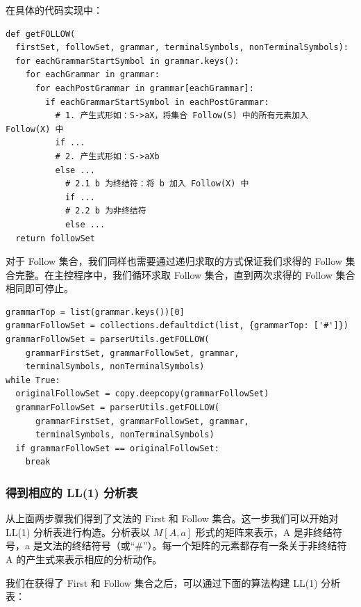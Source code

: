 \documentclass[UTF8]{ctexart}
\begin{document}
在具体的代码实现中：

\begin{verbatim}
def getFOLLOW(
  firstSet, followSet, grammar, terminalSymbols, nonTerminalSymbols):
  for eachGrammarStartSymbol in grammar.keys():
    for eachGrammar in grammar:
      for eachPostGrammar in grammar[eachGrammar]:
        if eachGrammarStartSymbol in eachPostGrammar:
          # 1. 产生式形如：S->aX，将集合 Follow(S) 中的所有元素加入 Follow(X) 中
          if ...
          # 2. 产生式形如：S->aXb
          else ...
            # 2.1 b 为终结符：将 b 加入 Follow(X) 中
            if ...
            # 2.2 b 为非终结符
            else ...
  return followSet
\end{verbatim}

对于 Follow 集合，我们同样也需要通过递归求取的方式保证我们求得的 Follow 集合完整。在主控程序中，我们循环求取 Follow 集合，直到两次求得的 Follow 集合相同即可停止。

\begin{verbatim}
grammarTop = list(grammar.keys())[0]
grammarFollowSet = collections.defaultdict(list, {grammarTop: ['#']})
grammarFollowSet = parserUtils.getFOLLOW(
    grammarFirstSet, grammarFollowSet, grammar,
    terminalSymbols, nonTerminalSymbols)
while True:
  originalFollowSet = copy.deepcopy(grammarFollowSet)
  grammarFollowSet = parserUtils.getFOLLOW(
      grammarFirstSet, grammarFollowSet, grammar,
      terminalSymbols, nonTerminalSymbols)
  if grammarFollowSet == originalFollowSet:
    break
\end{verbatim}

\subsubsection{得到相应的 LL(1) 分析表}
从上面两步骤我们得到了文法的 First 和 Follow 集合。这一步我们可以开始对 LL(1) 分析表进行构造。分析表以 $M[A,a]$ 形式的矩阵来表示，A 是非终结符号，a 是文法的终结符号（或“\#”）。每一个矩阵的元素都存有一条关于非终结符 A 的产生式来表示相应的分析动作。

我们在获得了 First 和 Follow 集合之后，可以通过下面的算法构建 LL(1) 分析表：

\noindent{}
\end{document}
